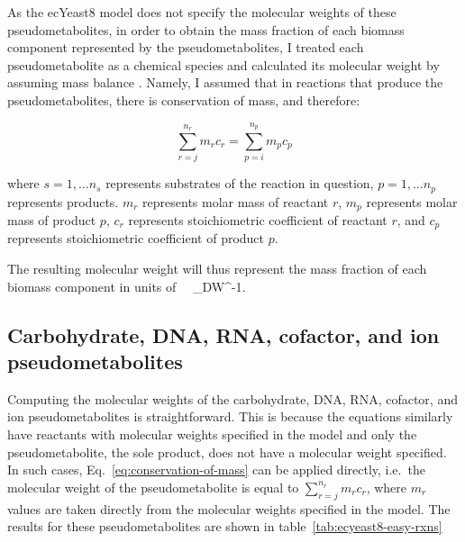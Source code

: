 As the ecYeast8 model does not specify the molecular weights of these pseudometabolites, in order to obtain the mass fraction of each biomass component represented by the pseudometabolites,
I treated each pseudometabolite as a chemical species and calculated its molecular weight by assuming mass balance \parencite{chanStandardizingBiomassReactions2017, dinhQuantifyingPropagationParametric2022, takhaveevTemporalSegregationBiosynthetic2023}.
Namely, I assumed that in reactions that produce the pseudometabolites, there is conservation of mass, and therefore:


\begin{equation}
  \sum_{r = j}^{n_{r}}m_{r}c_{r} = \sum_{p = i}^{n_{p}}m_{p}c_{p}
\label{eq:conservation-of-mass}
\end{equation}

where
$s = 1, \ldots n_{s}$ represents substrates of the reaction in question,
$p = 1, \ldots n_{p}$ represents products.
$m_{r}$ represents molar mass of reactant $r$,
$m_{p}$ represents molar mass of product $p$,
$c_{r}$ represents stoichiometric coefficient of reactant $r$, and
$c_{p}$ represents stoichiometric coefficient of product $p$.

The resulting molecular weight will thus represent the mass fraction of each biomass component in units of \SI{}{\gram~\gram_{DW}^{-1}}.


\subsection{Carbohydrate, DNA, RNA, cofactor, and ion pseudometabolites}
\label{append:model-molweights-easy}

Computing the molecular weights of the carbohydrate, DNA, RNA, cofactor, and ion pseudometabolites is straightforward.
This is because the equations similarly have reactants with molecular weights specified in the model and only the pseudometabolite, the sole product, does not have a molecular weight specified.
In such cases, Eq.\ \ref{eq:conservation-of-mass} can be applied directly, i.e.\ the molecular weight of the pseudometabolite is equal to $\sum_{r = j}^{n_{r}}m_{r}c_{r}$, where $m_{r}$ values are taken directly from the molecular weights specified in the model.
The results for these pseudometabolites are shown in table~\ref{tab:ecyeast8-easy-rxns}

